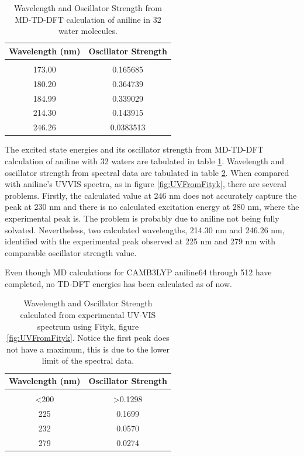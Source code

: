\documentclass[
journal=jpcbfk, %
manuscript=article]{achemso}
\begin{document}

\begin{table}[ht]
	\caption{Wavelength and Oscillator Strength from MD-TD-DFT calculation of aniline in 32 water molecules.}
	\label{table:aniline32TD-DFTTable}
	\centering
	\begin{tabular}{c c}
		Wavelength (nm) & Oscillator Strength\\ [1ex] %
		\hline\hline
		\\[-0.5ex]
		173.00&0.165685\\
		180.20&0.364739 \\
		184.99&0.339029\\
		214.30&0.143915\\
		246.26&0.0383513\\ [1ex]
	\end{tabular}
\end{table}

The excited state energies and its oscillator strength from MD-TD-DFT calculation of aniline with 32 waters are tabulated in table \ref{table:aniline32TD-DFTTable}. Wavelength and oscillator strength from spectral data are tabulated in table \ref{table:anilineUVTable}. When compared with aniline's UVVIS spectra, as in figure \ref{fig:UVFromFityk}, there are several problems. Firstly, the calculated value at 246 nm does not accurately capture the peak at 230 nm and there is no calculated excitation energy at 280 nm, where the experimental peak is. The problem is probably due to aniline not being fully solvated. Nevertheless, two calculated wavelengths, 214.30 nm and 246.26 nm, identified with the experimental peak observed at 225 nm and 279 nm with comparable oscillator strength value.

Even though MD calculations for CAMB3LYP aniline64 through 512 have completed, no TD-DFT energies has been calculated as of now. 

\begin{table}[ht]
	\caption{Wavelength and Oscillator Strength calculated from experimental UV-VIS spectrum using Fityk, figure \ref{fig:UVFromFityk}. Notice the first peak does not have a maximum, this is due to the lower limit of the spectral data.}
	\label{table:anilineUVTable}
	\centering
	\begin{tabular}{c c}
		Wavelength (nm) & Oscillator Strength\\ [1ex] %
		\hline\hline
		\\[-0.5ex]
		<200&>0.1298\\ 
		225&0.1699\\
		232&0.0570\\
		279&0.0274\\ 
	\end{tabular}
\end{table}
\end{document}
